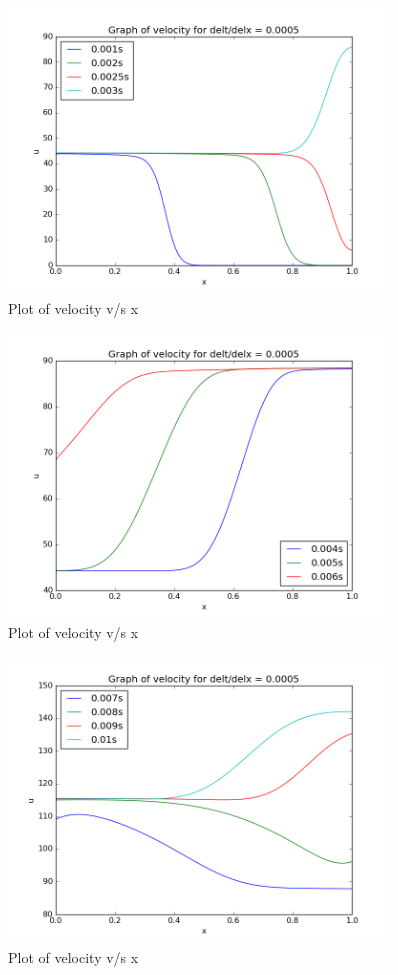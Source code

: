 \documentclass[11pt, a4paper]{article}
\begin{document}
\begin{figure}[H]
 \centering
 \includegraphics[width = 0.9\textwidth]{lax_fed_2_4.png}
 \caption{Plot of velocity v/s x}
\end{figure}
\begin{figure}[H]
 \centering
 \includegraphics[width = 0.9\textwidth]{lax_fed_2_5.png}
 \caption{Plot of velocity v/s x}
\end{figure}
\begin{figure}[H]
 \centering
 \includegraphics[width = 0.9\textwidth]{lax_fed_2_6.png}
 \caption{Plot of velocity v/s x}
\end{figure}
\end{document}
